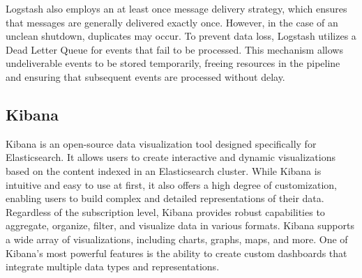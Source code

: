 Logstash also employs an at least once message delivery strategy, which ensures that messages are generally delivered exactly once.
However, in the case of an unclean shutdown, duplicates may occur. 
To prevent data loss, Logstash utilizes a Dead Letter Queue for events that fail to be processed. 
This mechanism allows undeliverable events to be stored temporarily, freeing resources in the pipeline and ensuring that subsequent events are processed without delay.

\subsection{Kibana}
Kibana is an open-source data visualization tool designed specifically for Elasticsearch. 
It allows users to create interactive and dynamic visualizations based on the content indexed in an Elasticsearch cluster. 
While Kibana is intuitive and easy to use at first, it also offers a high degree of customization, enabling users to build complex and detailed representations of their data.
Regardless of the subscription level, Kibana provides robust capabilities to aggregate, organize, filter, and visualize data in various formats.
Kibana supports a wide array of visualizations, including charts, graphs, maps, and more. 
One of Kibana's most powerful features is the ability to create custom dashboards that integrate multiple data types and representations.